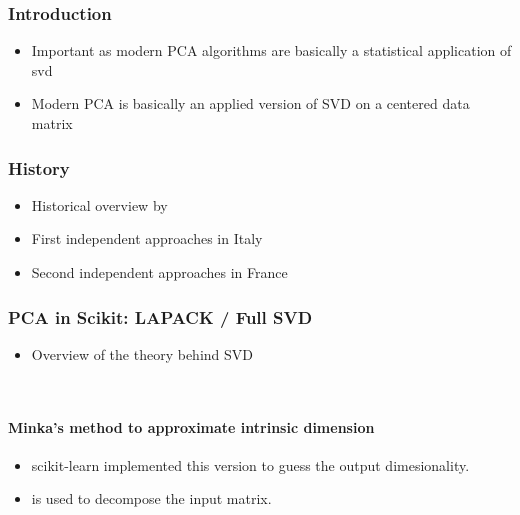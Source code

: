 \subsubsection{Introduction}

\begin{itemize}
	\item Important as modern PCA algorithms are basically a statistical application of \gls{svd}
	\item Modern PCA is basically an applied version of SVD on a centered data matrix
\end{itemize}

\clearpage



\subsubsection{History}

\begin{itemize}
	\item Historical overview by \cite{stewart1993early}
	\item First independent approaches in Italy \cite{beltrami1873sulle}
	\item Second independent approaches in France \cite{Jordan1874}
\end{itemize}

\clearpage



\subsubsection{PCA in Scikit: LAPACK / Full SVD}

\begin{itemize}
	\item Overview of the theory behind SVD
\end{itemize}

\ \clearpage
\ \clearpage


\paragraph{Minka's method to approximate intrinsic dimension}

\begin{itemize}
	\item scikit-learn implemented this version \cite{minka2000automatic} to guess the output dimesionality. 
	\item \cite{halko2011finding} is used to decompose the input matrix.
\end{itemize}

